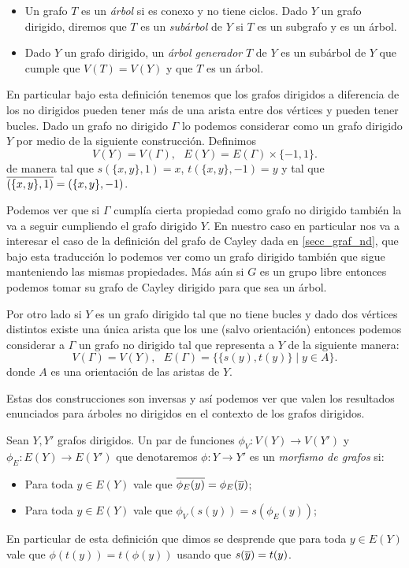 \documentclass[tesis.tex]{subfiles}
\begin{document}
\begin{deff}
\begin{itemize}
				
		\item Un grafo $T$ es un \emph{árbol} si es conexo y no tiene ciclos.
		Dado $Y$ un grafo dirigido, diremos que $T$ es un \emph{subárbol} de $Y$ si $T$ es un subgrafo y es un árbol. 
		
		\item Dado $Y$ un grafo dirigido, un \emph{árbol generador} $T$ de $Y$ es un subárbol de $Y$ que cumple que $V(T) = V(Y)$ y que $T$ es un árbol.
		
		
	\end{itemize}
\end{deff}	

En particular bajo esta definición tenemos que los grafos dirigidos a diferencia de los no dirigidos pueden tener más de una arista entre dos vértices y pueden tener bucles.
Dado un grafo no dirigido $\Gamma$ lo podemos considerar como un grafo dirigido $Y$ por medio de la siguiente construcción.
Definimos 
\[
V(Y) = V(\Gamma), \ \ \ E(Y) = E(\Gamma) \times \{ -1,1 \}.
\]
de manera tal que $ s(\{x,y\},1) = x $, $t(\{ x,y \}, -1) = y$ y tal que $\overline{(\{x,y\}, 1)} = (\{x,y\}, -1)$.

Podemos ver que si $\Gamma$ cumplía cierta propiedad como grafo no dirigido también la va a seguir cumpliendo el grafo dirigido $Y$.
En nuestro caso en particular nos va a interesar el caso de la definición del grafo de Cayley dada en \ref{secc_graf_nd}, que bajo esta traducción lo podemos ver como un grafo dirigido también que sigue manteniendo las mismas propiedades.
Más aún si $G$ es un grupo libre entonces podemos tomar su grafo de Cayley dirigido para que sea un árbol.

Por otro lado si $Y$ es un grafo dirigido tal que no tiene bucles y dado dos vértices distintos existe una única arista que los une (salvo orientación) entonces podemos considerar a $\Gamma$ un grafo no dirigido tal que representa a $Y$ de la siguiente manera:
\[
V(\Gamma) = V(Y), \ \ \ E(\Gamma) = \{ \{s(y), t(y) \} \mid y \in A \}.
\]
donde $A$ es una orientación de las aristas de $Y$.

Estas dos construcciones son inversas y así podemos ver que valen los resultados enunciados para árboles no dirigidos en el contexto de los grafos dirigidos.




\begin{deff}
	Sean $Y, Y'$ grafos dirigidos. 
	Un par de funciones $\phi_V:V(Y) \to V(Y')$ y $\phi_E: E(Y) \to E(Y')$ que denotaremos $\phi:Y \to Y'$ es un \emph{morfismo de grafos} si:
	\begin{itemize}
		\item Para toda $y \in E(Y)$ vale que $\overline{\phi_{E}(y)} = \phi_{E}(\overline y)$;
		\item Para toda $y \in E(Y)$ vale que $\phi_{V}(s(y)) = s(\phi_{E}(y))$;
	\end{itemize}   
	En particular de esta definición que dimos se desprende que para toda $y \in E(Y)$ vale que $\phi(t(y)) = t(\phi(y))$ usando que $s(\overline y) = t(y)$.
\end{deff}
\end{document}
